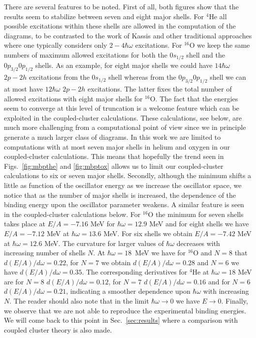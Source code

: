 There are several features to be noted. First of all, both figures show that the results
seem to stabilize between seven and eight  
major shells. For $^{4}$He all possible excitations within these shells
are allowed in the computation of the diagrams, to be contrasted to the work of 
Kassis \cite{kassis72} and other traditional approaches \cite{hko95} where one typically
considers only $2-4\hbar\omega$ excitations. For $^{16}$O we keep the same numbers
of maximum allowed excitations for both the $0s_{1/2}$ shell and the $0p_{3/2}0p_{1/2}$ shells.
As an example, 
for eight major shells we could have $14\hbar\omega$ $2p-2h$ excitations from the $0s_{1/2}$  shell
whereas from the   $0p_{3/2}0p_{1/2}$ shell we can at most have $12\hbar\omega$ $2p-2h$
excitations. The latter fixes the total number of allowed excitations with eight major
shells for $^{16}$O. 
The fact that the energies seem to converge at this level of truncation is a welcome
feature which can be exploited in the coupled-cluster calculations. These calculations,
see below, are much more challenging from a computational point of view since we in principle
generate a much larger class of diagrams. In this work we are 
limited to computations
with at most seven major shells in helium and  
oxygen in our
coupled-cluster calculations. This 
means that hopefully the trend seen in 
Figs.~\ref{fig:mbpthe} and \ref{fig:mbptox} allows us 
to limit our coupled-cluster
calculations to six or seven major shells. 
Secondly, although the minimum shifts a little 
as function of the oscillator energy as we increase the
oscillator space, we notice
that as the number of major shells is increased, the 
dependence of the binding energy 
upon the oscillator parameter weakens. A similar 
feature is seen in the coupled-cluster calculations
below.  
For $^{16}$O the minimum for seven shells 
takes place at $E/A=-7.16$ MeV for $\hbar\omega = 12.9$ MeV 
and for eight shells we have   $E/A=-7.12$ MeV at $\hbar\omega = 13.6$ MeV. For six shells
we obtain  $E/A=-7.42$ MeV at $\hbar\omega = 12.6$ MeV. 
The curvature for larger values of $\hbar\omega$ decreases with increasing number of shells $N$.
At $\hbar\omega =18$~MeV we have for $^{16}$O and $N=8$ that $d(E/A)/d\omega=0.22$, for 
$N=7$ we obtain $d(E/A)/d\omega=0.28$
and $N=6$ we have $d(E/A)/d\omega=0.35$. 
The corresponding derivatives  for $^{4}$He at $\hbar\omega=18$ MeV
are  for $N=8$ $d(E/A)/d\omega=0.12$, for 
$N=7$ $d(E/A)/d\omega=0.16$
and for $N=6$ $d(E/A)/d\omega=0.21$, indicating a smoother dependence upon $\hbar\omega$ with
increasing $N$.
The reader should also note that 
in the limit $\hbar\omega \rightarrow 0$ we have
$E\rightarrow 0$.  
Finally, we observe that we are not able to 
reproduce the experimental binding energies.
We will come back to this point in Sec.~\ref{sec:results} where a comparison
with coupled cluster theory is also made.


